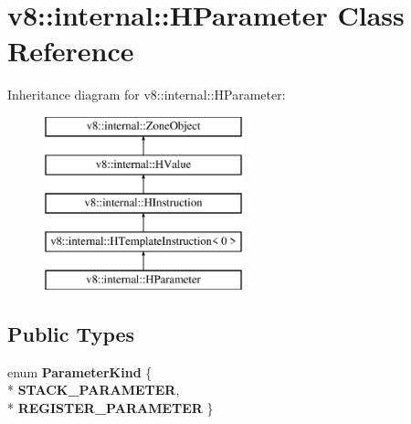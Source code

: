 \hypertarget{classv8_1_1internal_1_1_h_parameter}{}\section{v8\+:\+:internal\+:\+:H\+Parameter Class Reference}
\label{classv8_1_1internal_1_1_h_parameter}
Inheritance diagram for v8\+:\+:internal\+:\+:H\+Parameter\+:\begin{figure}[H]
\begin{center}
\leavevmode
\includegraphics[height=5.000000cm]{classv8_1_1internal_1_1_h_parameter}
\end{center}
\end{figure}
\subsection*{Public Types}
\begin{DoxyCompactItemize}
\item 
enum {\bfseries Parameter\+Kind} \{ \\*
{\bfseries S\+T\+A\+C\+K\+\_\+\+P\+A\+R\+A\+M\+E\+T\+ER}, 
\\*
{\bfseries R\+E\+G\+I\+S\+T\+E\+R\+\_\+\+P\+A\+R\+A\+M\+E\+T\+ER}
 \}\hypertarget{classv8_1_1internal_1_1_h_parameter_aafb136101aa1c0418ec16edf1426200b}{}\label{classv8_1_1internal_1_1_h_parameter_aafb136101aa1c0418ec16edf1426200b}

\end{DoxyCompactItemize}

